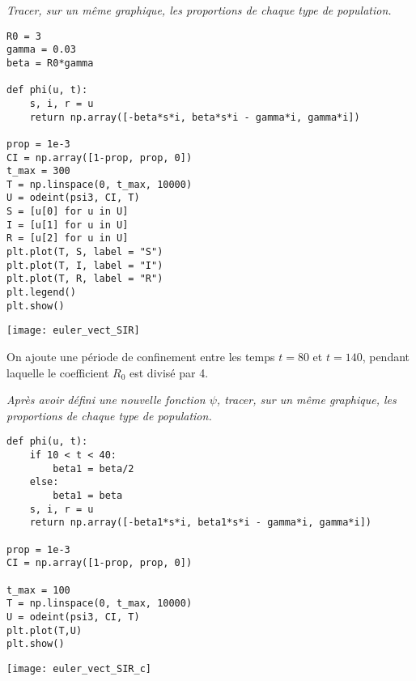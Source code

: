 \begin{Exercise}\it 
Tracer, sur un même graphique, les proportions de chaque type de population.
\end{Exercise}
\begin{Answer}
\begin{lstlisting}
R0 = 3
gamma = 0.03
beta = R0*gamma

def phi(u, t):
    s, i, r = u
    return np.array([-beta*s*i, beta*s*i - gamma*i, gamma*i])

prop = 1e-3
CI = np.array([1-prop, prop, 0])
t_max = 300
T = np.linspace(0, t_max, 10000)
U = odeint(psi3, CI, T)
S = [u[0] for u in U]
I = [u[1] for u in U]
R = [u[2] for u in U]
plt.plot(T, S, label = "S")
plt.plot(T, I, label = "I")
plt.plot(T, R, label = "R")
plt.legend()
plt.show()
\end{lstlisting}
\newpage
\end{Answer}
\begin{center}
\texttt{[image: euler\_vect\_SIR]}
\end{center}
On ajoute une période de confinement entre les temps $t= 80$ et $t = 140$, pendant laquelle le coefficient $R_0$ est divisé par 4.
\begin{Exercise}\it 
Après avoir défini une nouvelle fonction $\psi$, tracer, sur un même graphique, les proportions de chaque type de population.
\end{Exercise}
\begin{Answer}
\begin{lstlisting}
def phi(u, t):
    if 10 < t < 40:
        beta1 = beta/2
    else:
        beta1 = beta
    s, i, r = u
    return np.array([-beta1*s*i, beta1*s*i - gamma*i, gamma*i])

prop = 1e-3
CI = np.array([1-prop, prop, 0])

t_max = 100
T = np.linspace(0, t_max, 10000)
U = odeint(psi3, CI, T)
plt.plot(T,U)
plt.show()
\end{lstlisting}
\end{Answer}
\begin{center}
\texttt{[image: euler\_vect\_SIR\_c]}
\end{center}
